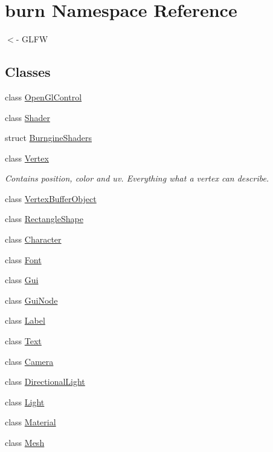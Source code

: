 \hypertarget{namespaceburn}{\section{burn Namespace Reference}
\label{namespaceburn}
}


$<$-\/ G\-L\-F\-W  


\subsection*{Classes}
\begin{DoxyCompactItemize}
\item 
class \hyperlink{classburn_1_1_open_gl_control}{Open\-Gl\-Control}
\item 
class \hyperlink{classburn_1_1_shader}{Shader}
\item 
struct \hyperlink{structburn_1_1_burngine_shaders}{Burngine\-Shaders}
\item 
class \hyperlink{classburn_1_1_vertex}{Vertex}
\begin{DoxyCompactList}\small\item\em Contains position, color and uv. Everything what a vertex can describe. \end{DoxyCompactList}\item 
class \hyperlink{classburn_1_1_vertex_buffer_object}{Vertex\-Buffer\-Object}
\item 
class \hyperlink{classburn_1_1_rectangle_shape}{Rectangle\-Shape}
\item 
class \hyperlink{classburn_1_1_character}{Character}
\item 
class \hyperlink{classburn_1_1_font}{Font}
\item 
class \hyperlink{classburn_1_1_gui}{Gui}
\item 
class \hyperlink{classburn_1_1_gui_node}{Gui\-Node}
\item 
class \hyperlink{classburn_1_1_label}{Label}
\item 
class \hyperlink{classburn_1_1_text}{Text}
\item 
class \hyperlink{classburn_1_1_camera}{Camera}
\item 
class \hyperlink{classburn_1_1_directional_light}{Directional\-Light}
\item 
class \hyperlink{classburn_1_1_light}{Light}
\item 
class \hyperlink{classburn_1_1_material}{Material}
\item 
class \hyperlink{classburn_1_1_mesh}{Mesh}
\item 

\end{DoxyCompactItemize}
